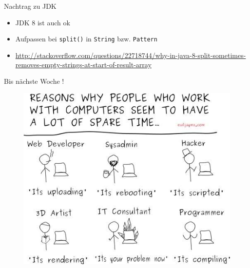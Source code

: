 \documentclass[18pt]{beamer}
\begin{document}
\begin{frame}{Nachtrag zu JDK}
    \begin{itemize}
        \item JDK 8 ist auch ok
        \item \alert{Aufpassen bei \texttt{split()} in \texttt{String} bzw. \texttt{Pattern}}
        \item \url{http://stackoverflow.com/questions/22718744/why-in-java-8-split-sometimes-removes-empty-strings-at-start-of-result-array}
    \end{itemize}
\end{frame}



\appendix
\beginbackup

\begin{frame}{Bis nächste Woche !}
    \begin{figure}
        \includegraphics[scale=0.4]{img/sparetime.jpg}
    \end{figure}
\end{frame}

\backupend
\end{document}
